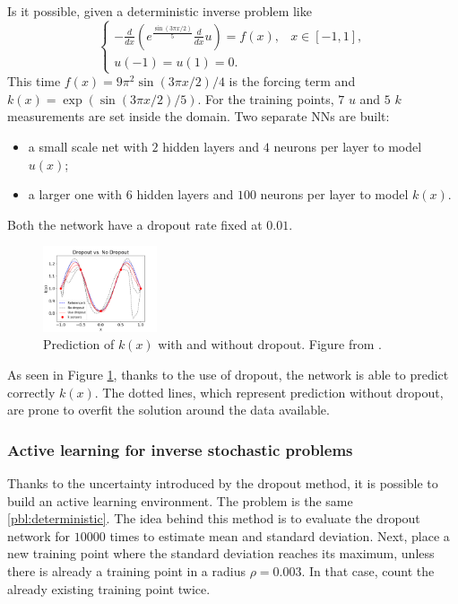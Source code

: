 \documentclass[11pt,a4paper]{article}
\begin{document}
Is it possible, given a deterministic inverse problem like 
\begin{equation}
    \begin{cases}
        \displaystyle -\frac{d}{dx} \left(e^{\frac{\sin(3\pi x/2)}{5}} \frac{d}{dx}u\right) = f(x), & x \in [-1,1], \\
        u(-1) = u(1) = 0.
    \end{cases}
    \label{pbl:deterministic}
\end{equation}
This time \(f(x) = 9\pi^2\sin(3\pi x /2)/4\) is the forcing term and \(k(x) = \exp(\sin(3\pi x/2)/5)\). For the training points, \(7\) \(u\) and \(5\) \(k\) measurements are set inside the domain. Two separate NNs are built: 
\begin{itemize}
    \item a small scale net with \(2\) hidden layers and \(4\) neurons per layer to model \(u(x)\);
    \item a larger one with \(6\) hidden layers and \(100\) neurons per layer to model \(k(x)\).
\end{itemize} 
Both the network have a dropout rate fixed at \(0.01\).

\begin{figure}[H]
    \centering 
    \includegraphics[width=0.3\textwidth]{Images/dropout_k.png}
    \captionsetup{justification=centering,margin=1cm}
    \caption{Prediction of \(k(x)\) with and without dropout. Figure from \cite{Zhang_2019}.}
    \label{fig:drop_k}
\end{figure}

As seen in Figure \ref{fig:drop_k}, thanks to the use of dropout, the network is able to predict correctly \(k(x)\). The dotted lines, which represent prediction without dropout, are prone to overfit the solution around the data available.
\subsubsection{Active learning for inverse stochastic problems}
Thanks to the uncertainty introduced by the dropout method, it is possible to build an active learning environment. The problem is the same \eqref{pbl:deterministic}. The idea behind this method is to evaluate the dropout network for \(10000\) times to estimate mean and standard deviation. Next, place a new training point where the standard deviation reaches its maximum, unless there is already a training point in a radius \(\rho = 0.003\). In that case, count the already existing training point twice. 
\end{document}
